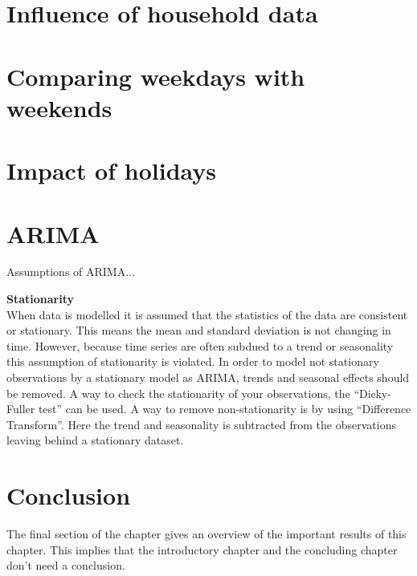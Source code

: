 \section{Influence of household data}


\section{Comparing weekdays with weekends}

\section{Impact of holidays}


\section{ARIMA}
Assumptions of ARIMA...

\textbf{Stationarity}\\
When data is modelled it is assumed that the statistics of the data are consistent or stationary. This means the mean and standard deviation is not changing in time. However, because time series are often subdued to a trend or seasonality this assumption of stationarity is violated. In order to model not stationary observations by a stationary model as ARIMA, trends and seasonal effects should be removed. A way to check the stationarity of your observations, the ``Dicky-Fuller test'' can be used.
A way to remove non-stationarity is by using ``Difference Transform''. Here the trend and seasonality is subtracted from the observations leaving behind a stationary dataset.


\section{Conclusion}
The final section of the chapter gives an overview of the important results
of this chapter. This implies that the introductory chapter and the
concluding chapter don't need a conclusion.




